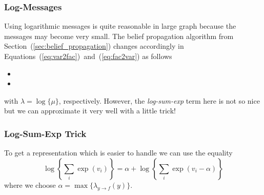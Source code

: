 \subsubsection{Log-Messages}%
Using logarithmic messages is quite reasonable in large graph because the messages may become very small. %
The belief propagation algorithm from Section~(\ref{sec:belief_propagation}) changes accordingly in Equations~(\ref{eq:var2fac})~and~(\ref{eq:fac2var}) as follows %
\begin{itemize}
	\item{}
	\item{}
\end{itemize}
with \ensuremath{\lambda = \log\{\mu\}}, respectively. %
However, the \emph{log-sum-exp} term here is not so nice but we can approximate it very well with a little trick! %
\\[.3cm]%
%
%
%
\subsubsection{Log-Sum-Exp Trick}%
To get a representation which is easier to handle we can use the equality %
\begin{equation}
	\log\left\{ \sum_i \exp(v_i) \right\} = \alpha + \log\left\{ \sum_i \exp(v_i-\alpha) \right\}
\end{equation}
where we choose \ensuremath{\alpha = \max\{ \lambda_{y\rightarrow f}(y) \}}. %
%
%
%

